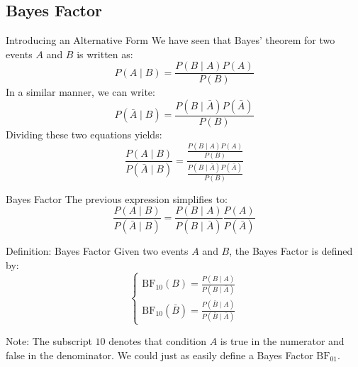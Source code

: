 \subsection{Bayes Factor}

\begin{frame}{Introducing an Alternative Form}
	We have seen that Bayes' theorem for two events $A$ and $B$ is written as:
	\begin{equation}
		P(A \mid B) = \frac{P(B \mid A) P(A)}{P(B)}
		\nonumber
	\end{equation}
	\pause
	In a similar manner, we can write:
	\begin{equation}
		P(\bar{A} \mid B) = \frac{P(B \mid \bar{A}) P(\bar{A})}{P(B)}
		\nonumber
	\end{equation}
	\pause
	Dividing these two equations yields:
	\begin{equation}
		\frac{P(A \mid B)}{P(\bar{A} \mid B)} = \frac{\frac{P(B \mid A) P(A)}{P(B)}}{\frac{P(B \mid \bar{A}) P(\bar{A})}{P(B)}}
		\nonumber
	\end{equation}	
\end{frame}

\begin{frame}{Bayes Factor}
	The previous expression simplifies to:
	\begin{equation}
		\frac{P(A \mid B)}{P(\bar{A} \mid B)} = \frac{P(B \mid A)}{P(B \mid \bar{A})} \frac{P(A)}{P(\bar{A})}
		\nonumber
	\end{equation}
	\begin{block}{Definition: Bayes Factor}
		Given two events $A$ and $B$, the Bayes Factor is defined by:
		\begin{equation}
			\begin{cases}
				\text{BF}_{10}(B) = \displaystyle \frac{P(B \mid A)}{P(B \mid \bar{A})} \\[10pt]
				\text{BF}_{10}(\bar{B}) = \displaystyle \frac{P(\bar{B} \mid A)}{P(\bar{B} \mid \bar{A})}
			\end{cases}
			\nonumber
		\end{equation}
	\end{block}
	Note: The subscript $10$ denotes that condition $A$ is true in the numerator and false in the denominator. We could just as easily define a Bayes Factor $\text{BF}_{01}$.
\end{frame}

